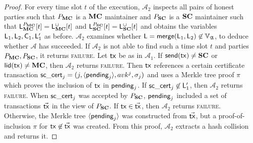 \begin{proof}
  For every time slot $t$ of the execution, $\mathcal{A}_2$ inspects all pairs
  of honest parties such that $P_{\mathbf{MC}}$ is a $\mathbf{MC}$ maintainer and $P_{\mathbf{SC}}$ is
  a $\mathbf{SC}$ maintainer such that
  $\mathsf{L}_{\mathbf{MC}}^{P_{\mathbf{MC}}}[t] = \mathsf{L}_{\mathbf{MC}}^\cup[t]$ and
  $\mathsf{L}_{\mathbf{SC}}^{P_{\mathbf{SC}}}[t] = \mathsf{L}_{\mathbf{SC}}^\cup[t]$
  and obtains the variables $\mathsf{L}_1, \mathsf{L}_2, \mathsf{C}_1,
  \mathsf{L}'_1$ as before. $\mathcal{A}_2$ examines whether $\mathsf{L} =
  \mathsf{merge}(\mathsf{L}_1, \mathsf{L}_2) \not\in\mathbb{V}_{\mathfrak{A}}$, to deduce whether $\mathcal{A}$
  has succeeded. If $\mathcal{A}_2$ is not able to find such a time slot $t$ and
  parties $P_{\mathbf{MC}}, P_{\mathbf{SC}}$, it returns \textsc{failure}. Let $\mathsf{tx}$ be as in
  $\mathcal{A}_1$. If $\mathsf{send}(\mathsf{tx}) \neq \mathbf{SC}$ or $\mathsf{lid}(\mathsf{tx}) \neq \mathbf{MC}$, then
  $\mathcal{A}_2$ returns \textsc{failure}. Then $\mathsf{tx}$ references a certain
  certificate transaction $\mathsf{sc\_cert}_j = (j,\langle\mathsf{pending}_j\rangle, avk^j,\sigma_j)$ and
  uses a Merkle tree proof $\pi$ which proves the inclusion of $\mathsf{tx}$ in
  $\mathsf{pending}_j$. If $\mathsf{sc\_cert}_j \not\in \mathsf{L}'_1$,
  then $\mathcal{A}_2$ returns
  \textsc{failure}. When $\mathsf{sc\_cert}_j$ was accepted by $P_{\mathbf{SC}}$, $\mathsf{pending}_j$
  included a set of transactions $\vec{\mathsf{tx}}$ in the view of $P_{\mathbf{SC}}$. If $\mathsf{tx}
  \in \vec{\mathsf{tx}}$, then $\mathcal{A}_2$ returns \textsc{failure}. Otherwise, the
  Merkle tree $\langle\mathsf{pending}_j\rangle$ was constructed from $\vec{\mathsf{tx}}$, but a
  proof-of-inclusion $\pi$ for $\mathsf{tx} \not\in \vec{\mathsf{tx}}$ was created. From this
  proof, $\mathcal{A}_2$ extracts a hash collision and returns it.


\end{proof}
